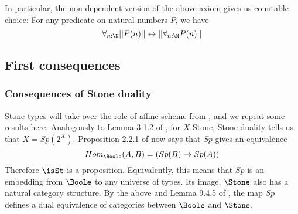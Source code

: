 


\begin{corollary}
  In particular, the non-dependent version of the above axiom gives 
  us countable choice:
  For any predicate on natural numbers $P$, we have 
  \begin{equation}
    \forall_{n:\N} ||P(n) ||
    \leftrightarrow 
    || \forall_{n:\N} P(n) ||
  \end{equation}
\end{corollary}

\subsection{First consequences}
\subsubsection{Consequences of Stone duality}
\begin{remark}\label{SpIsAntiEquivalence}
Stone types will take over the role of affine scheme from \cite{draft}, 
and we repeat some results here. 
Analogously to Lemma 3.1.2 of \cite{draft}, 
for $X$ Stone, Stone duality tells us that $X = Sp(2^X)$. 
%
Proposition 2.2.1 of \cite{draft} now says that 
$Sp$ gives an equivalence 
\begin{equation}
   Hom_{\Boole} (A, B) = (Sp(B) \to Sp(A))
\end{equation}
Therefore $\isSt$ is a proposition.
Equivalently, 
this means that 
$Sp$ is an embedding from $\Boole$ to any universe of types.
Its image, $\Stone$ also has a natural category structure.
By the above and Lemma 9.4.5 of \cite{hott}, 
the map $Sp$ defines a dual equivalence of categories between $\Boole$ and $\Stone$.
\end{remark}


